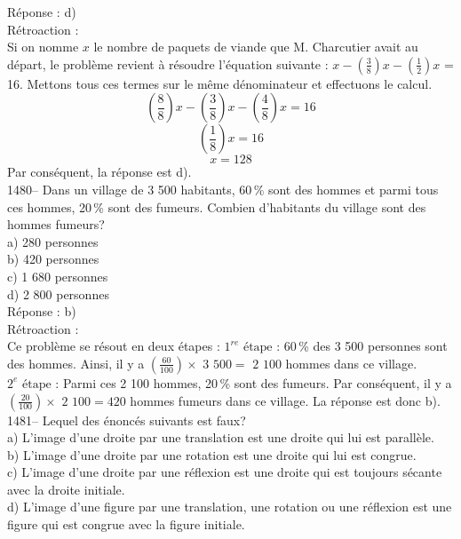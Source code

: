R\'eponse : d)\\

R\'etroaction :\\
Si on nomme $x$ le nombre de paquets de viande que M. Charcutier
avait au d\'epart, le probl\`eme revient \`a r\'esoudre l'\'equation
suivante :
$x-\left(\frac{3}{8}\right)x-\left(\frac{1}{2}\right)x$ = 16. Mettons tous
ces termes sur le m\^eme
d\'enominateur et effectuons le calcul.
$$\left(\frac{8}{8}\right)x-\left(\frac{3}{8}\right)x-\left(\frac{4}{8}\right)x
= 16$$ $$\left(\frac{1}{8}\right)x = 16$$
$$x = 128$$ Par cons\'equent, la r\'eponse est d).\\

1480-- Dans un village de 3 500 habitants, 60\,\% sont des hommes et
parmi tous ces hommes, 20\,\% sont des fumeurs. Combien d'habitants
du village sont des
hommes fumeurs?\\
a) 280 personnes\\
b) 420 personnes\\
c) 1 680 personnes\\
d) 2 800 personnes\\

R\'eponse : b)\\

R\'etroaction :\\
Ce probl\`eme se r\'esout en deux \'etapes : \vskip 10pt
$1^{re}{\textrm{ \'etape}}$ : 60\,\% des 3 500 personnes sont des
hommes. Ainsi, il y a $\left(\frac{60}{100}\right)\times{\textrm{ 3
500}}={\textrm{ 2 100}}$ hommes dans ce village. \vskip 10pt $2^e
{\textrm{ \'etape}}$ : Parmi ces 2 100 hommes, 20\,\% sont des
fumeurs. Par cons\'equent, il y a
$\left(\frac{20}{100}\right)\times{\textrm{ 2 100}}=420$ hommes fumeurs dans
ce village. La r\'eponse est donc b).\\

1481-- Lequel des \'enonc\'es suivants est faux?\\
a) L'image d'une droite par une translation est une droite qui lui est
parall\`ele.\\
b) L'image d'une droite par une rotation est une droite qui lui est
congrue.\\
c) L'image d'une droite par une r\'eflexion est une droite qui est toujours
s\'ecante avec la droite initiale.\\
d) L'image d'une figure par une translation, une rotation ou une
r\'eflexion
est une figure qui est congrue avec la figure initiale.\\

